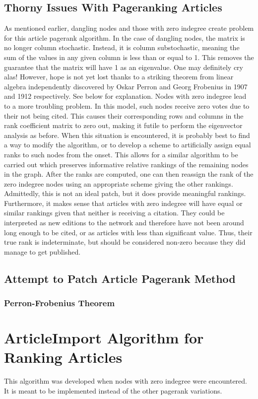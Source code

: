 \documentclass[12pt]{article} %
\begin{document}
  \subsection{Thorny Issues With Pageranking Articles}
    As mentioned earlier, dangling nodes and those with zero indegree create problem for this article pagerank algorithm. In the case of dangling nodes, the matrix is no longer column stochastic. Instead, it is column substochastic, meaning the sum of the values in any given column is less than or equal to 1. This removes the guarantee that the matrix will have 1 as an eigenvalue. One may definitely cry alas! However, hope is not yet lost thanks to a striking theorem from linear algebra independently discovered by Oskar Perron and Georg Frobenius in 1907 and 1912 respectively. See below for explanation. 
    Nodes with zero indegree lead to a more troubling problem. In this model, such nodes receive zero votes due to their not being cited. This causes their corresponding rows and columns in the rank coefficient matrix to zero out, making it futile to perform the eigenvector analysis as before. When this situation is encountered, it is probably best to find a way to modify the algorithm, or to develop a scheme to artificially assign equal ranks to such nodes from the onset. This allows for a similar algorithm to be carried out which preserves informative relative rankings of the remaining nodes in the graph. After the ranks are computed, one can then reassign the rank of the zero indegree nodes using an appropriate scheme giving the other rankings. Admittedly, this is not an ideal patch, but it does provide meaningful rankings. Furthermore, it makes sense that articles with zero indegree will have equal or similar rankings given that neither is receiving a citation. They could be interpreted as new editions to the network and therefore have not been around long enough to be cited, or as articles with less than significant value. Thus, their true rank is indeterminate, but should be considered non-zero because they did manage to get published.
    
  \subsection{Attempt to Patch Article Pagerank Method}
    \subsubsection{Perron-Frobenius Theorem}
\section{ArticleImport Algorithm for Ranking Articles}
    This algorithm was developed when nodes with zero indegree were encountered. It is meant to be implemented instead of the other pagerank variations. 
\end{document}
